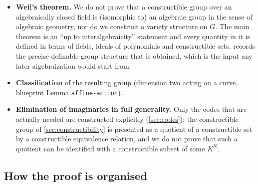 \begin{itemize}
\item \textbf{Weil's theorem.}  We do not prove that a constructible group over an
  algebraically closed field is (isomorphic to) an algebraic group in the sense of
  algebraic geometry, nor do we construct a variety structure on $G$.  The main
  theorem is an ``up to interalgebraicity'' statement and every quantity in it is
  defined in terms of fields, ideals of polynomials and constructible sets.
   records the precise definable-group structure that
  is obtained, which is the input any later algebraization would start from.
\item \textbf{Classification} of the resulting group (dimension two acting on a
  curve, blueprint Lemma \texttt{affine-action}).
\item \textbf{Elimination of imaginaries in full generality.}  Only the codes that
  are actually needed are constructed explicitly (\cref{sec:codes}); the
  constructible group of \cref{sec:constructibility} is presented as a quotient of a
  constructible set by a constructible equivalence relation, and we do not prove
  that such a quotient can be identified with a constructible subset of some $K^N$.
\end{itemize}

\subsection{How the proof is organised}

